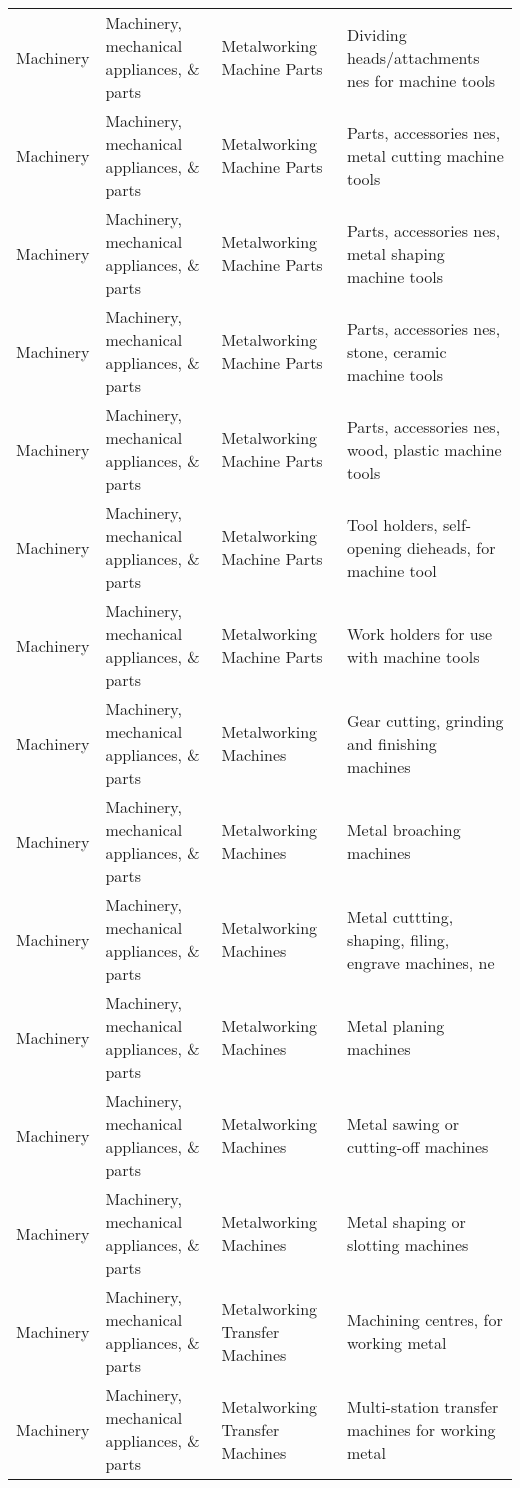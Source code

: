 \begin{appendices}
\begin{xltabular}{\textwidth}{|p{0.07\textwidth}|p{0.25\textwidth}|p{0.28\textwidth}|p{0.3\textwidth}|}
		Machinery & Machinery, mechanical appliances, \& parts & Metalworking Machine Parts & Dividing heads/attachments nes for machine tools \\
		Machinery & Machinery, mechanical appliances, \& parts & Metalworking Machine Parts & Parts, accessories nes, metal cutting machine tools \\
		Machinery & Machinery, mechanical appliances, \& parts & Metalworking Machine Parts & Parts, accessories nes, metal shaping machine tools \\
		Machinery & Machinery, mechanical appliances, \& parts & Metalworking Machine Parts & Parts, accessories nes, stone, ceramic machine tools \\
		Machinery & Machinery, mechanical appliances, \& parts & Metalworking Machine Parts & Parts, accessories nes, wood, plastic machine tools \\
		Machinery & Machinery, mechanical appliances, \& parts & Metalworking Machine Parts & Tool holders, self-opening dieheads, for machine tool \\
		Machinery & Machinery, mechanical appliances, \& parts & Metalworking Machine Parts & Work holders for use with machine tools \\
		Machinery & Machinery, mechanical appliances, \& parts & Metalworking Machines & Gear cutting, grinding and finishing machines \\
		Machinery & Machinery, mechanical appliances, \& parts & Metalworking Machines & Metal broaching machines \\
		Machinery & Machinery, mechanical appliances, \& parts & Metalworking Machines & Metal cuttting, shaping, filing, engrave machines, ne \\
		Machinery & Machinery, mechanical appliances, \& parts & Metalworking Machines & Metal planing machines \\
		Machinery & Machinery, mechanical appliances, \& parts & Metalworking Machines & Metal sawing or cutting-off machines \\
		Machinery & Machinery, mechanical appliances, \& parts & Metalworking Machines & Metal shaping or slotting machines \\
		Machinery & Machinery, mechanical appliances, \& parts & Metalworking Transfer Machines & Machining centres, for working metal \\
		Machinery & Machinery, mechanical appliances, \& parts & Metalworking Transfer Machines & Multi-station transfer machines for working metal \\

\end{xltabular}
\end{appendices}

